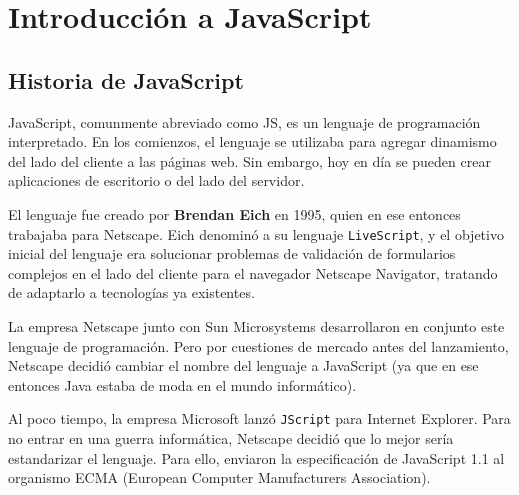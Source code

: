 
\chapter{Introducción a JavaScript} %

\label{Chapter1} %


\newcommand{\keyword}[1]{\textbf{#1}}
\newcommand{\tabhead}[1]{\textbf{#1}}
\newcommand{\code}[1]{\texttt{#1}}
\newcommand{\file}[1]{\texttt{\bfseries#1}}
\newcommand{\option}[1]{\texttt{\itshape#1}}


\section{Historia de JavaScript}

JavaScript, comunmente abreviado como \textsc{JS}, es un lenguaje de programación interpretado. En los comienzos, el lenguaje se utilizaba para agregar dinamismo del lado del cliente a las páginas web. Sin embargo, hoy en día se pueden crear aplicaciones de escritorio o del lado del servidor.

El lenguaje fue creado por \textbf{Brendan Eich} en 1995, quien en ese entonces trabajaba para Netscape. Eich denominó a su lenguaje \texttt{LiveScript}, y el objetivo inicial del lenguaje era solucionar problemas de validación de formularios complejos en el lado del cliente para el navegador Netscape Navigator, tratando de adaptarlo a tecnologías ya existentes. 

La empresa Netscape junto con Sun Microsystems desarrollaron en conjunto este lenguaje de programación. Pero por cuestiones de mercado antes del lanzamiento, Netscape decidió cambiar el nombre del lenguaje a JavaScript (ya que en ese entonces Java estaba de moda en el mundo informático).

Al poco tiempo, la empresa Microsoft lanzó \texttt{JScript} para Internet Explorer. Para no entrar en una guerra informática, Netscape decidió que lo mejor sería estandarizar el lenguaje. Para ello, enviaron la especificación de JavaScript 1.1 al organismo ECMA (European Computer Manufacturers Association).

